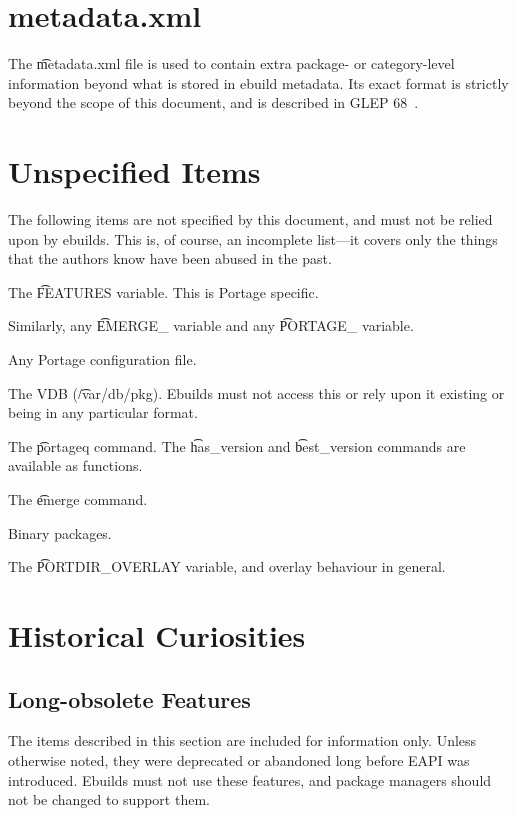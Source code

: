 \chapter{metadata.xml}
\label{ch:metadata-xml}

The \t{metadata.xml} file is used to contain extra package- or category-level information beyond
what is stored in ebuild metadata. Its exact format is strictly beyond the scope of this document,
and is described in GLEP 68~\cite{Glep68}.

\chapter{Unspecified Items}

The following items are not specified by this document, and must not be relied upon by ebuilds.
This is, of course, an incomplete list---it covers only the things that the authors know have
been abused in the past.

\begin{compactitem}
\item The \t{FEATURES} variable. This is Portage specific.
\item Similarly, any \t{EMERGE_} variable and any \t{PORTAGE_} variable.
\item Any Portage configuration file.
\item The VDB (\t{/var/db/pkg}). Ebuilds must not access this or rely upon it existing or being
    in any particular format.
\item The \t{portageq} command. The \t{has_version} and \t{best_version} commands are
    available as functions.
\item The \t{emerge} command.
\item Binary packages.
\item The \t{PORTDIR_OVERLAY} variable, and overlay behaviour in general.
\end{compactitem}

\chapter{Historical Curiosities}

\section{Long-obsolete Features}

The items described in this section are included for information only. Unless otherwise noted, they
were deprecated or abandoned long before EAPI was introduced. Ebuilds must not use these features,
and package managers should not be changed to support them.

